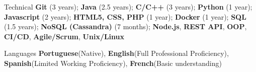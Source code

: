 
\begin{cvskills}
  \cvskill
    {Technical} %
    {\textbf{Git} (3 years); \textbf{Java} (2.5 years); \textbf{C/C++} (3 years); \textbf{Python} (1 year); \textbf{Javascript} (2 years); \textbf{HTML5, CSS, PHP} (1 year); \textbf{Docker} (1 year); \textbf{SQL} (1.5 years); \textbf{NoSQL (Cassandra)} (7 months); \textbf{Node.js}, \textbf{REST API}, \textbf{OOP}, \textbf{CI/CD}, \textbf{Agile/Scrum}, \textbf{Unix/Linux}} %

  \cvskill
    {Languages} %
    {\textbf{Portuguese}(Native), \textbf{English}(Full Professional Proficiency), \textbf{Spanish}(Limited Working Proficiency), \textbf{French}(Basic understanding) } %

\end{cvskills}